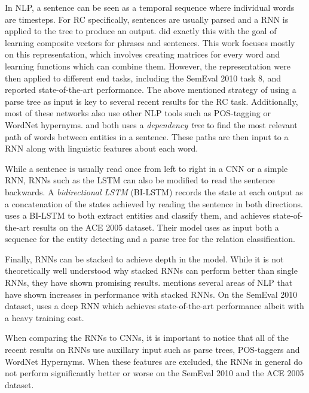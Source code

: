 In NLP, a sentence can be seen as a temporal sequence where individual words are timesteps. For RC specifically, sentences are usually parsed and a RNN is applied to the tree to produce an output. \cite{socher2012} did exactly this with the goal of learning composite vectors for phrases and sentences. This work focuses mostly on this representation, which involves creating matrices for every word and learning functions which can combine them. However, the representation were then applied to different end tasks, including the SemEval 2010 task 8, and reported state-of-the-art performance. 
The above mentioned strategy of using a parse tree as input is key to several recent results for the RC task. Additionally, most of these networks also use other NLP tools such as POS-tagging or WordNet hypernyms. \cite{xu2015a} and \cite{ebrahimi2015} both uses a \emph{dependency tree} to find the most relevant path of words between entities in a sentence. These paths are then input to a RNN along with linguistic features about each word. 

While a sentence is usually read once from left to right in a CNN or a simple RNN, RNNs such as the LSTM can also be modified to read the sentence backwards. A \emph{bidirectional LSTM} (BI-LSTM) records the state at each output as a concatenation of the states achieved by reading the sentence in both directions. \cite{re_lstm} uses a BI-LSTM to both extract entities and classify them, and achieves state-of-the-art results on the ACE 2005 dataset. Their model uses as input both a sequence for the entity detecting and a parse tree for the relation classification.

Finally, RNNs can be stacked to achieve depth in the model. While it is not theoretically well understood why stacked RNNs can perform better than single RNNs, they have shown promising results. \cite{goldberg2015} mentions several areas of NLP that have shown increases in performance with stacked RNNs. On the SemEval 2010 dataset, \cite{xu2016} uses a deep RNN which achieves state-of-the-art performance albeit with a heavy training cost. 

When comparing the RNNs to CNNs, it is important to notice that all of the recent results on RNNs use auxillary input such as parse trees, POS-taggers and WordNet Hypernyms. When these features are excluded, the RNNs in general do not perform significantly better or worse on the SemEval 2010 and the ACE 2005 dataset.   

